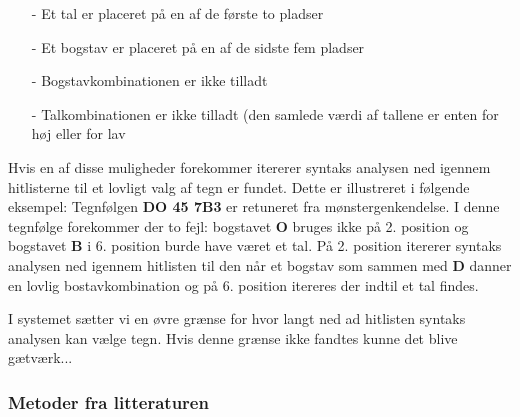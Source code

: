 \begin{itemize}
\item[-] Et tal er placeret på en af de første to pladser
\item[-] Et bogstav er placeret på en af de sidste fem pladser
\item[-] Bogstavkombinationen er ikke tilladt
\item[-] Talkombinationen er ikke tilladt (den samlede værdi af tallene er enten for høj eller for lav
\end{itemize}

Hvis en af disse muligheder forekommer itererer syntaks analysen ned igennem hitlisterne til et lovligt valg af tegn er fundet. Dette er illustreret i følgende eksempel: Tegnfølgen \textbf{DO 45 7B3} er retuneret fra mønstergenkendelse. I denne tegnfølge forekommer der to fejl: bogstavet \textbf{O} bruges ikke på 2. position og bogstavet \textbf{B} i 6. position burde have været et tal. På 2. position itererer syntaks analysen ned igennem hitlisten til den når et bogstav som sammen med \textbf{D} danner en lovlig bostavkombination og på 6. position itereres der indtil et tal findes.

I systemet sætter vi en øvre grænse for hvor langt ned ad hitlisten syntaks analysen kan vælge tegn. Hvis denne grænse ikke fandtes kunne det blive gætværk...

\subsubsection{Metoder fra litteraturen}
